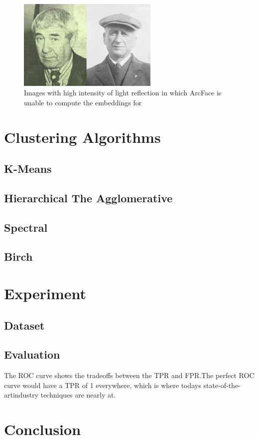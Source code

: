 \documentclass[12pt,english]{article}
\begin{document}
\begin{figure}[!tbp]
 \centering
    \includegraphics[width=0.6\textwidth]{figures/ex.png}
    \caption{Images with high intensity of light reflection in which ArcFace is unable to compute the embeddings for \cite{chinapas}}
	\label{fig:arcface2}
\end{figure}

\section{Clustering Algorithms}

\subsection{K-Means}

\subsection{Hierarchical The Agglomerative}

\subsection{Spectral}

\subsection{Birch}

\section{Experiment}


\subsection{Dataset}


\subsection{Evaluation}

The ROC curve shows the tradeoffs between the TPR and FPR.The perfect ROC curve would have a TPR of 1 everywhere, which is where todays state-of-the-artindustry techniques are nearly at. \cite{amos}

\section{Conclusion}

\nocite{*}

\printbibliography
\end{document}
